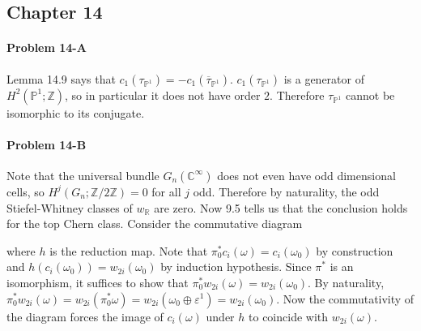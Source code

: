 \documentclass[12pt]{article}
\theoremstyle{plain}
\theoremstyle{definition}
\newcommand{\IC}{\mathbb{C}}
\newcommand{\IP}{\mathbb{P}}
\newcommand{\IR}{\mathbb{R}}
\newcommand{\IZ}{\mathbb{Z}}
\newcommand{\<}{\langle}
\renewcommand{\>}{\rangle}
\newcommand{\w}{\omega}
\newcommand{\sm}{\varepsilon}
\begin{document}
\subsection*{Chapter 14}
\paragraph{Problem 14-A} Lemma 14.9 says that $c_1(\tau_{\IP^1}) = - c_1(\overline{\tau}_{\IP^1})$. $c_1(\tau_{\IP^1})$ is a generator of $H^2(\IP^1; \IZ)$, so in particular it does not have order $2$. Therefore $\tau_{\IP^1}$ cannot be isomorphic to its conjugate. 


\paragraph{Problem 14-B} Note that the universal bundle $G_n(\IC^\infty)$ does not even have odd dimensional cells, so $H^j(G_n; \IZ/2\IZ) = 0$ for all $j$ odd. Therefore by naturality, the odd Stiefel-Whitney classes of $w_\IR$ are zero. Now 9.5 tells us that the conclusion holds for the top Chern class. Consider the commutative diagram 
\begin{center}
\end{center}
where $h$ is the reduction map. Note that $\pi_0^* c_i (\w) = c_i ( \w_0 )$ by construction and $h(c_i(\w_0)) = w_{2i}(\w_0)$ by induction hypothesis. Since $\pi^*$ is an isomorphism, it suffices to show that $\pi_0^* w_{2i}(\w) = w_{2i}(\w_0)$. By naturality, $\pi_0^* w_{2i}(\w) = w_{2i}(\pi_0^* \w) = w_{2i}(\w_0 \oplus \sm^1) = w_{2i}(\w_0)$. Now the commutativity of the diagram forces the image of $c_i(\w)$ under $h$ to coincide with $w_{2i}(\w)$. 
\end{document}
